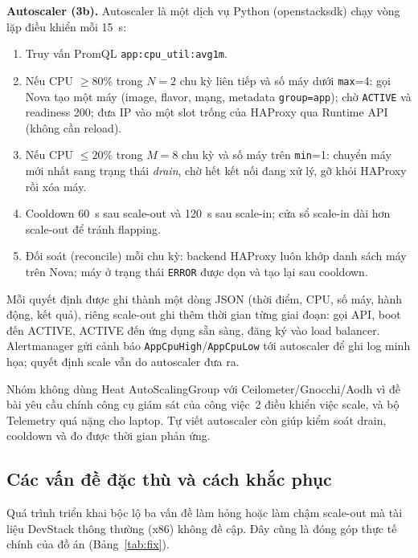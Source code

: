 \documentclass[runningheads]{llncs}
\newcommand{\code}[1]{\texttt{#1}}
\begin{document}
\textbf{Autoscaler (3b).} Autoscaler là một dịch vụ Python (openstacksdk) chạy vòng lặp điều khiển mỗi 15~s:
\begin{enumerate}
\item Truy vấn PromQL \code{app:cpu\_util:avg1m}.
\item Nếu CPU $\geq 80\%$ trong $N=2$ chu kỳ liên tiếp và số máy dưới \code{max}=4: gọi Nova tạo một máy (image, flavor, mạng, metadata \code{group=app}); chờ \code{ACTIVE} và readiness 200; đưa IP vào một slot trống của HAProxy qua Runtime API (không cần reload).
\item Nếu CPU $\leq 20\%$ trong $M=8$ chu kỳ và số máy trên \code{min}=1: chuyển máy mới nhất sang trạng thái \emph{drain}, chờ hết kết nối đang xử lý, gỡ khỏi HAProxy rồi xóa máy.
\item Cooldown 60~s sau scale-out và 120~s sau scale-in; cửa sổ scale-in dài hơn scale-out để tránh flapping.
\item Đối soát (reconcile) mỗi chu kỳ: backend HAProxy luôn khớp danh sách máy trên Nova; máy ở trạng thái \code{ERROR} được dọn và tạo lại sau cooldown.
\end{enumerate}
Mỗi quyết định được ghi thành một dòng JSON (thời điểm, CPU, số máy, hành động, kết quả), riêng scale-out ghi thêm thời gian từng giai đoạn: gọi API, boot đến ACTIVE, ACTIVE đến ứng dụng sẵn sàng, đăng ký vào load balancer. Alertmanager gửi cảnh báo \code{AppCpuHigh}/\code{AppCpuLow} tới autoscaler để ghi log minh họa; quyết định scale vẫn do autoscaler đưa ra.

Nhóm không dùng Heat AutoScalingGroup với Ceilometer/Gnocchi/Aodh vì đề bài yêu cầu chính công cụ giám sát của công việc~2 điều khiển việc scale, và bộ Telemetry quá nặng cho laptop. Tự viết autoscaler còn giúp kiểm soát drain, cooldown và đo được thời gian phản ứng.

\subsection{Các vấn đề đặc thù và cách khắc phục}

Quá trình triển khai bộc lộ ba vấn đề làm hỏng hoặc làm chậm scale-out mà tài liệu DevStack thông thường (x86) không đề cập. Đây cũng là đóng góp thực tế chính của đồ án (Bảng~\ref{tab:fix}).
\end{document}
